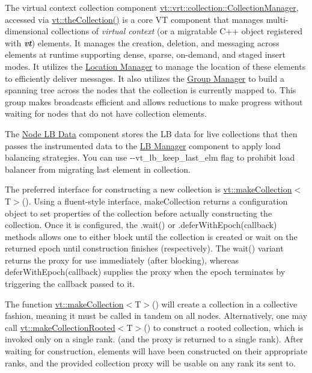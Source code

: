 The virtual context collection component {\ttfamily \hyperlink{structvt_1_1vrt_1_1collection_1_1_collection_manager}{vt\+::vrt\+::collection\+::\+Collection\+Manager}}, accessed via {\ttfamily \hyperlink{namespacevt_a1c45ce63bfd2c327ff7d76a319a371d8}{vt\+::the\+Collection()}} is a core VT component that manages multi-\/dimensional collections of {\itshape virtual context} (or a migratable C++ object registered with {\bfseries {\itshape vt}}) elements. It manages the creation, deletion, and messaging across elements at runtime supporting dense, sparse, on-\/demand, and staged insert modes. It utilizes the \hyperlink{location}{Location Manager} to manage the location of these elements to efficiently deliver messages. It also utilizes the \hyperlink{group}{Group Manager} to build a spanning tree across the nodes that the collection is currently mapped to. This group makes broadcasts efficient and allows reductions to make progress without waiting for nodes that do not have collection elements.

The \hyperlink{node-lb-data}{Node LB Data} component stores the LB data for live collections that then passes the instrumented data to the \hyperlink{lb-manager}{LB Manager} component to apply load balancing strategies. You can use {\ttfamily -\/-\/vt\+\_\+lb\+\_\+keep\+\_\+last\+\_\+elm} flag to prohibit load balancer from migrating last element in collection.

The preferred interface for constructing a new collection is {\ttfamily \hyperlink{namespacevt_a19a89f0706559e09bbe84eec1ff9f1e7}{vt\+::make\+Collection}$<$T$>$()}. Using a fluent-\/style interface, {\ttfamily make\+Collection} returns a configuration object to set properties of the collection before actually constructing the collection. Once it is configured, the {\ttfamily .wait()} or {\ttfamily .defer\+With\+Epoch(callback)} methods allows one to either block until the collection is created or wait on the returned epoch until construction finishes (respectively). The {\ttfamily wait()} variant returns the proxy for use immediately (after blocking), whereas {\ttfamily defer\+With\+Epoch(callback)} supplies the proxy when the epoch terminates by triggering the callback passed to it.

The function {\ttfamily \hyperlink{namespacevt_a19a89f0706559e09bbe84eec1ff9f1e7}{vt\+::make\+Collection}$<$T$>$()} will create a collection in a collective fashion, meaning it must be called in tandem on all nodes. Alternatively, one may call {\ttfamily \hyperlink{namespacevt_acbbf58b2c85959c964a7ae8c536fe9bc}{vt\+::make\+Collection\+Rooted}$<$T$>$()} to construct a rooted collection, which is invoked only on a single rank. (and the proxy is returned to a single rank). After waiting for construction, elements will have been constructed on their appropriate ranks, and the provided collection proxy will be usable on any rank it\textquotesingle{}s sent to.

